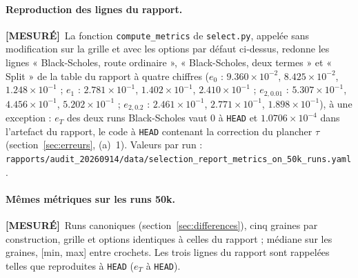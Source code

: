 \documentclass[11pt]{article}
\newcommand{\mesure}{\textbf{[MESURÉ]}}
\newcommand{\code}[1]{\texttt{#1}}
\begin{document}
\paragraph{Reproduction des lignes du rapport.} \mesure\ La fonction
\code{compute\_metrics} de \code{select.py}, appelée sans modification sur la
grille et avec les options par défaut ci-dessus, redonne les lignes
« Black-Scholes, route ordinaire », « Black-Scholes, deux termes » et
« Split » de la table du rapport à quatre chiffres
($e_0$ : $9.360\times10^{-2}$, $8.425\times10^{-2}$, $1.248\times10^{-1}$ ;
$e_1$ : $2.781\times10^{-1}$, $1.402\times10^{-1}$, $2.410\times10^{-1}$ ;
$e_{2,0.01}$ : $5.307\times10^{-1}$, $4.456\times10^{-1}$, $5.202\times10^{-1}$ ;
$e_{2,0.2}$ : $2.461\times10^{-1}$, $2.771\times10^{-1}$, $1.898\times10^{-1}$),
à une exception : $e_T$ des deux runs Black-Scholes vaut $0$ à \code{HEAD}
et $1.0706\times10^{-4}$ dans l'artefact du rapport, le code à \code{HEAD}
contenant la correction du plancher $\tau$ (section~\ref{sec:erreurs}, (a)~1).
Valeurs par run : \code{rapports/audit\_20260914/data/selection\_report\_metrics\_on\_50k\_runs.yaml}.

\paragraph{Mêmes métriques sur les runs 50k.} \mesure\ Runs
canoniques (section~\ref{sec:differences}), cinq graines par construction,
grille et options identiques à celles du rapport ; médiane sur les graines,
[min, max] entre crochets. Les trois lignes du rapport sont rappelées telles
que reproduites à \code{HEAD} ($e_T$ à \code{HEAD}).
\end{document}
